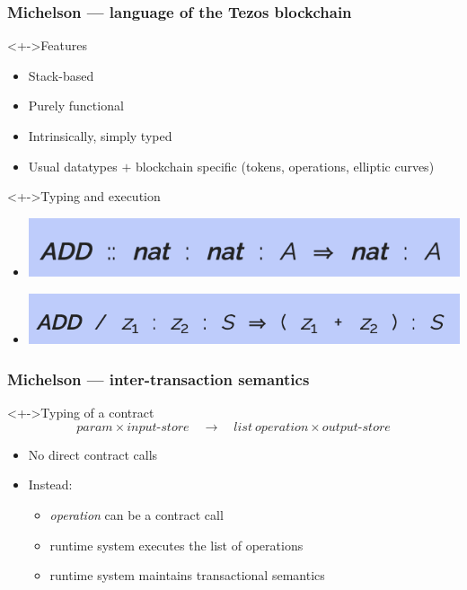 \documentclass[aspectratio=1610]{beamer}
\begin{document}
\begin{frame}
  \frametitle{Michelson --- language of the Tezos blockchain}
  \begin{block}<+->{Features}
  \begin{itemize}
  \item Stack-based
  \item Purely functional
  \item Intrinsically, simply typed
  \item Usual datatypes $+$ blockchain specific (tokens, operations, elliptic curves)
  \end{itemize}
\end{block}
\begin{block}<+->{Typing and execution}
  \begin{itemize}
  \item \includegraphics[scale=0.75]{add-typing}
  \item \includegraphics[scale=0.75]{add-semantics}
  \end{itemize}
\end{block}
\end{frame}
\begin{frame}
  \frametitle{Michelson --- inter-transaction semantics}
\begin{block}<+->{Typing of a contract}
  \Large\vspace{-\baselineskip}
  \begin{displaymath}
    \mathit{param} \times \mathit{input\text{-}store} \quad\to\quad \mathit{list~operation} \times \mathit{output\text{-}store}
  \end{displaymath}
\end{block}
  \begin{itemize}
  \item No direct contract calls
  \item Instead:
    \begin{itemize}
    \item \textit{operation} can be a contract call
    \item runtime system executes the list of operations
    \item runtime system maintains transactional semantics
    \end{itemize}
  \end{itemize}
\end{frame}
\end{document}
